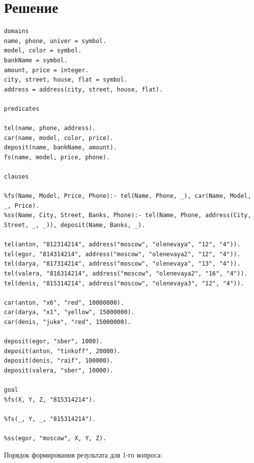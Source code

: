 \documentclass[12pt]{report}
\begin{document}
\chapter*{Решение}
\begin{lstlisting}
domains
name, phone, univer = symbol.
model, color = symbol.
bankName = symbol.
amount, price = integer.
city, street, house, flat = symbol.
address = address(city, street, house, flat).

predicates

tel(name, phone, address).
car(name, model, color, price).
deposit(name, bankName, amount).
fs(name, model, price, phone).

clauses

%fs(Name, Model, Price, Phone):- tel(Name, Phone, _), car(Name, Model, _, Price).
%ss(Name, City, Street, Banks, Phone):- tel(Name, Phone, address(City, Street, _, _)), deposit(Name, Banks, _).

tel(anton, "812314214", address("moscow", "olenevaya", "12", "4")).
tel(egor, "814314214", address("moscow", "olenevaya2", "12", "4")).
tel(darya, "817314214", address("moscow", "olenevaya", "13", "4")).
tel(valera, "816314214", address("moscow", "olenevaya2", "16", "4")).
tel(denis, "815314214", address("moscow", "olenevaya3", "12", "4")).

car(anton, "x6", "red", 10000000).
car(darya, "x1", "yellow", 15000000).
car(denis, "juke", "red", 15000000).

deposit(egor, "sber", 1000).
deposit(anton, "tinkoff", 20000).
deposit(denis, "raif", 100000).
deposit(valera, "sber", 10000).

goal
%fs(X, Y, Z, "815314214").

%fs(_, Y, _, "815314214").

%ss(egor, "moscow", X, Y, Z).
\end{lstlisting}


Порядок формирования результата для 1-го вопроса:
\end{document}
